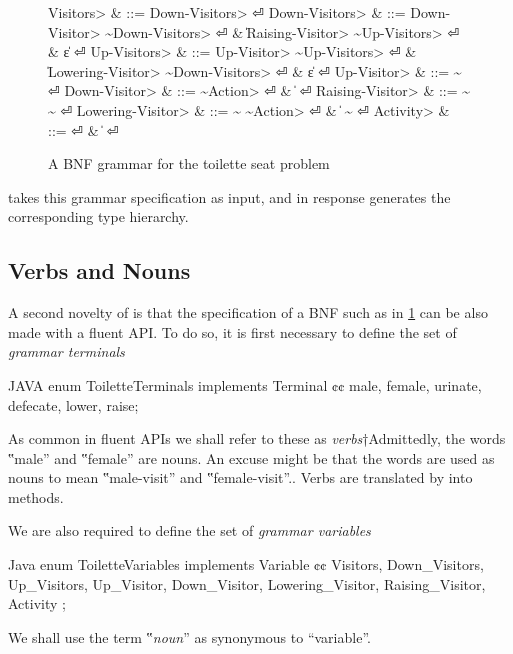 \begin{figure}[H]
  \begin{Grammar}
    \begin{aligned}
      \<Visitors>         & ::= \<Down-Visitors> \hfill⏎
      \<Down-Visitors>    & ::= \<Down-Visitor> \~\<Down-Visitors> \hfill⏎
      {}                  & \| \<Raising-Visitor> \~\<Up-Visitors> \hfill⏎
      {}                  & \| ε \hfill⏎
      \<Up-Visitors>      & ::= \<Up-Visitor> \~\<Up-Visitors> \hfill⏎
      {}                  & \| \<Lowering-Visitor> \~\<Down-Visitors> \hfill⏎
      {}                  & \| ε \hfill⏎
      \<Up-Visitor>       & ::=  \~ \hfill⏎
      \<Down-Visitor>     & ::=  \~\<Action> \hfill⏎
                          & \|   \hfill⏎
      \<Raising-Visitor>  & ::=  \~ \~ \hfill⏎
      \<Lowering-Visitor> & ::=  \~ \~\<Action> \hfill⏎
                          & \|  \~  \hfill⏎
      \<Activity>         & ::=  \hfill⏎
                          & \|  \hfill⏎
    \end{aligned}
  \end{Grammar}
  \caption{A BNF grammar for the toilette seat problem}
  \label{Figure:BNF}
\end{figure}

\Self takes this grammar specification as input, and in response
  generates the corresponding
  \Java type hierarchy.

\subsection{Verbs and Nouns}
A second novelty of \Self is that the specification of a BNF such as in 
  \cref{Figure:BNF} can be also made with a \Java fluent API.
To do so, it is first necessary to
  define the set of \emph{grammar terminals}
  \begin{code}{JAVA}
enum ToiletteTerminals implements Terminal {¢¢
  male, female,
  urinate, defecate,
  lower, raise;
}
\end{code}
As common in fluent APIs we shall refer to these
as \emph{verbs}†{Admittedly, the words ‟male” and ‟female” are nouns. 
  An excuse might be that the words are used as nouns to mean ‟male-visit” and ‟female-visit”.}.
Verbs are translated by \Self into methods.

We are also required to define the set of \emph{grammar variables}
\begin{code}{Java}
enum ToiletteVariables implements Variable {¢¢
  Visitors, Down_Visitors, Up_Visitors,
  Up_Visitor, Down_Visitor,
  Lowering_Visitor, Raising_Visitor,
  Activity
};
\end{code}
  We shall use the term ‟\emph{noun}” as synonymous to ``variable''.

